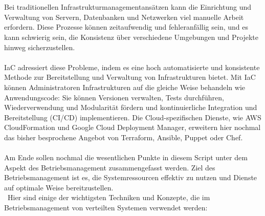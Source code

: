 \\\\
Bei traditionellen Infrastrukturmanagementansätzen kann die Einrichtung und Verwaltung von Servern, Datenbanken und Netzwerken viel manuelle Arbeit erfordern. Diese Prozesse können zeitaufwendig und fehleranfällig sein, und es kann schwierig sein, die Konsistenz über verschiedene Umgebungen und Projekte hinweg sicherzustellen.
\\\\
IaC adressiert diese Probleme, indem es eine hoch automatisierte und konsistente Methode zur Bereitstellung und Verwaltung von Infrastrukturen bietet. Mit IaC können Administratoren Infrastrukturen auf die gleiche Weise behandeln wie Anwendungscode: Sie können Versionen verwalten, Tests durchführen, Wiederverwendung und Modularität fördern und kontinuierliche Integration und Bereitstellung (CI/CD) implementieren.
Die Cloud-spezifischen Dienste, wie AWS CloudFormation und Google Cloud Deployment Manager, erweitern hier nochmal das bisher besprochene Angebot von Terraform, Ansible, Puppet oder Chef.
\\\\ 
Am Ende sollen nochmal die wesentlichen Punkte in diesem Script unter dem Aspekt des Betriebsmanagement zusammengefasst werden. Ziel des Betriebsmanagement ist es, die Systemressourcen effektiv zu nutzen und Dienste auf optimale Weise bereitzustellen.
\\\
Hier sind einige der wichtigsten Techniken und Konzepte, die im Betriebsmanagement von verteilten Systemen verwendet werden:
